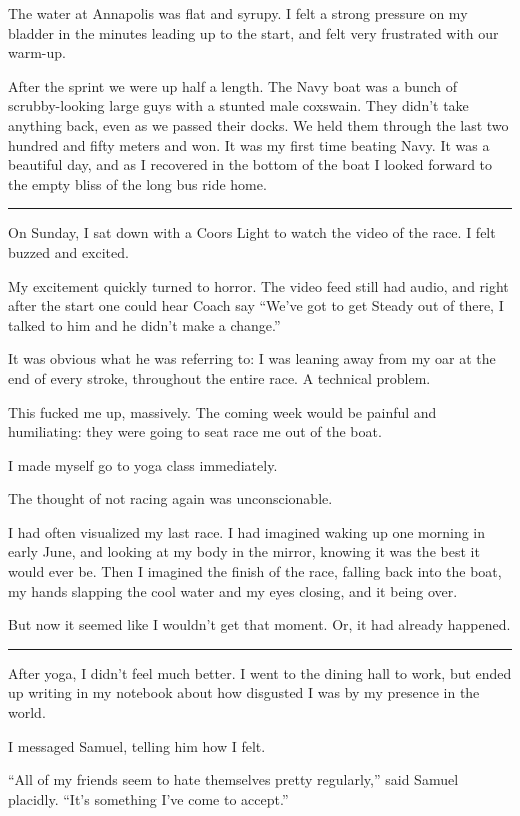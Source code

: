 The water at Annapolis was flat and syrupy.  I felt a strong pressure on my
bladder in the minutes leading up to the start, and felt very frustrated with
our warm-up.   

After the sprint we were up half a length.  The Navy boat was a bunch of
scrubby-looking large guys with a stunted male coxswain.  They didn't take
anything back, even as we passed their docks.  We held them through the last two
hundred and fifty meters and won.  It was my first time beating Navy.  It was a
beautiful day, and as I recovered in the bottom of the boat I looked forward to
the empty bliss of the long bus ride home.

\plainfancybreak{12pt}{2}{* * *}

On Sunday, I sat down with a Coors Light to watch the video of the race.  I felt
buzzed and excited. 

My excitement quickly turned to horror.  The video feed still had audio, and
right after the start one could hear Coach say ``We've got to get Steady out of
there, I talked to him and he didn't make a change.''  

It was obvious what he was referring to: I was leaning away from my oar at the
end of every stroke, throughout the entire race.  A technical problem.

This fucked me up, massively.  The coming week would be painful and humiliating:
they were going to seat race me out of the boat.

I made myself go to yoga class immediately.  

The thought of not racing again was unconscionable.  

I had often visualized my last race.  I had imagined waking up one morning in
early June, and looking at my body in the mirror, knowing it was the best it
would ever be.  Then I imagined the finish of the race, falling back into the
boat, my hands slapping the cool water and my eyes closing, and it being over.

But now it seemed like I wouldn't get that moment.  Or, it had already happened.

\plainfancybreak{12pt}{2}{* * *}

After yoga, I didn't feel much better.  I went to the dining hall to work, but
ended up writing in my notebook about how disgusted I was by my presence in the
world.

I messaged Samuel, telling him how I felt.

``All of my friends seem to hate themselves pretty regularly,'' said Samuel
placidly.  ``It's something I've come to accept.''

